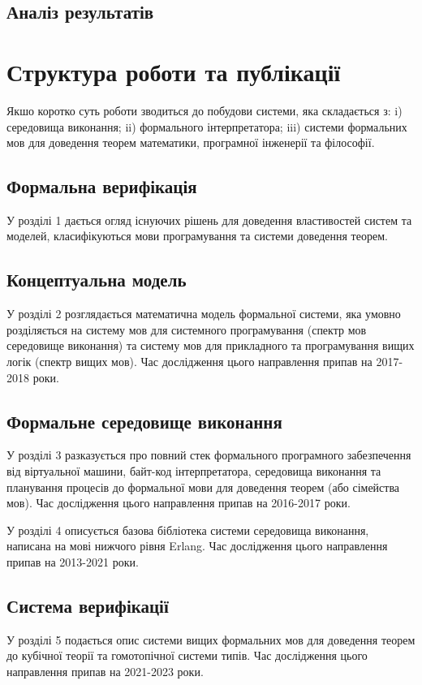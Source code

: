 \subsection{Аналіз результатів}

\newpage
\section{Структура роботи та публікації}
Якшо коротко суть роботи зводиться до побудови системи, яка складається з:
i) середовища виконання; ii) формального інтерпретатора; iii) системи формальних мов
для доведення теорем математики, програмної інженерії та філософії.

\subsection*{Формальна верифікація}
У розділі 1 дається огляд існуючих рішень для доведення
властивостей систем та моделей, класифікуються мови програмування
та системи доведення теорем.

\subsection*{Концептуальна модель}
У розділі 2 розглядається математична модель формальної системи,
яка умовно розділяється на систему мов для системного
програмування (спектр мов середовище виконання) та систему мов для
прикладного та програмування вищих логік (спектр вищих мов).
Час дослідження цього направлення припав на 2017-2018 роки.

\subsection*{Формальне середовище виконання}
У розділі 3 разказується про повний стек формального програмного забезпечення
від віртуальної машини, байт-код інтерпретатора, середовища виконання
та планування процесів до формальної мови для доведення теорем (або сімейства мов).
Час дослідження цього направлення припав на 2016-2017 роки.

У розділі 4 описується базова бібліотека системи середовища виконання,
написана на мові нижчого рівня Erlang.
Час дослідження цього направлення припав на 2013-2021 роки.

\subsection*{Система верифікації}
У розділі 5 подається опис системи вищих формальних мов для доведення теорем до
кубічної теорії та гомотопічної системи типів.
Час дослідження цього направлення припав на 2021-2023 роки.

